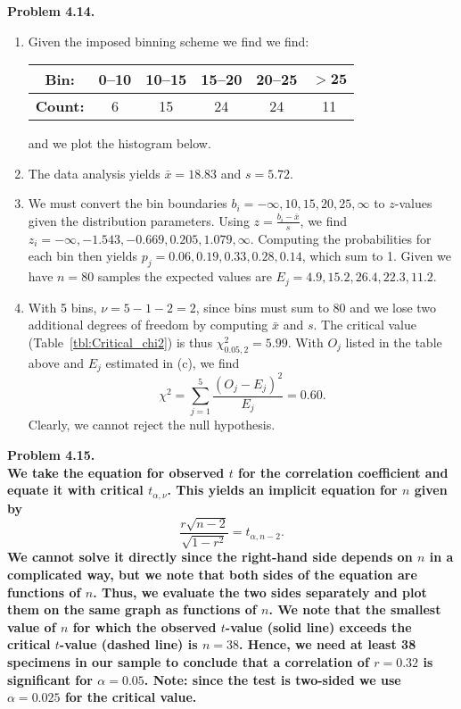 \noindent
\bf{Problem 4.14.} \\

\begin{enumerate}[label=\alph*)]
\item Given the imposed binning scheme we find we find:
\begin{table}[H]
\centering
\begin{tabular}{|c||c|c|c|c|c|} \hline
\bf{Bin:} & \bf{0--10} & \bf{10--15} & \bf{15--20} & \bf{20--25} & $\mathbf{> 25}$ \\ \hline
\bf{Count:} & 6 & 15 & 24 & 24 & 11 \\ \hline
\end{tabular}
\end{table}
and we plot the histogram below.
\item The data analysis yields $\bar{x} = 18.83$ and $s = 5.72$.
\item We must convert the bin boundaries $b_i = -\infty,10,15,20,25,\infty$ to $z$-values given
the distribution parameters.  Using $z = \frac{b_i - \bar{x}}{s}$, we find
$z_i = -\infty,  -1.543, -0.669, 0.205,  1.079, \infty$.  Computing the probabilities for each
bin then yields $p_j = 0.06, 0.19, 0.33, 0.28, 0.14$, which sum to 1.  Given we have $n = 80$ samples
the expected values are $E_j = 4.9, 15.2, 26.4, 22.3, 11.2$.
\item With 5 bins, $\nu = 5 - 1 -2 = 2$, since bins must sum to 80 and we lose two additional degrees of
freedom by computing $\bar{x}$ and $s$. The critical value (Table~\ref{tbl:Critical_chi2}) is thus $\chi^2_{0.05,2} = 5.99$.
With $O_j$ listed in the table above and $E_j$ estimated in (c), we find
\[
	\chi^2=\sum^5_{j=1}\frac{(O_j-E_j)^2}{E_j} = 0.60.
\]
Clearly, we cannot reject the null hypothesis.
\end{enumerate}

\noindent
\bf{Problem 4.15.} \\

We take the equation for observed $t$ for the correlation coefficient and equate it
with critical $t_{\alpha, \nu}$.  This yields an implicit equation for $n$ given by
\[
	\frac{r \sqrt{n-2}}{\sqrt{1-r^2}} = t_{\alpha, n-2}.
\]
We cannot solve it directly since the right-hand side depends on $n$ in a complicated way, but we note that both sides
of the equation are functions of $n$.  Thus, we evaluate the two sides separately
and plot them on the same graph as functions of $n$.  We note that the smallest value of $n$ for which
the observed $t$-value (solid line) exceeds the critical $t$-value (dashed line) is $n = 38$.  Hence, we need at least
38 specimens in our sample to conclude that a correlation of $r = 0.32$ is significant for $\alpha = 0.05$.  Note:
since the test is two-sided we use $\alpha = 0.025$ for the critical value.



